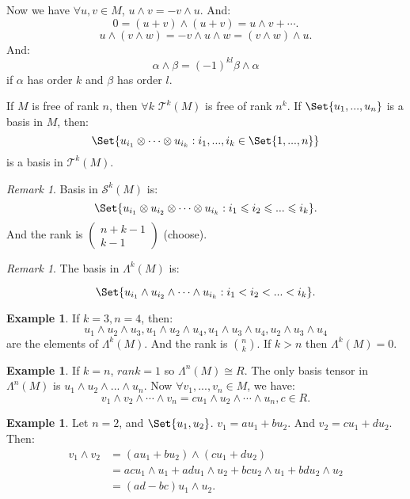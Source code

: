 \documentclass[9pt,reqno,twoside]{amsbook}
\theoremstyle{plain}
\numberwithin{section}{chapter}
\numberwithin{equation}{chapter}
\theoremstyle{definition}
\newtheorem{Ex}[theorem]{Example}
\theoremstyle{remark}
\newtheorem{rem}[theorem]{Remark}
\theoremstyle{plain}
\newcommand{\mc}{\mathcal}
\newcommand{\bee}{\begin{equation}\begin{aligned}}
\newcommand{\eee}{\end{aligned}\end{equation}}
\newcommand{\tens}{\otimes}
\newcommand{\lpar}{\left(}
\newcommand{\rpar}{\right)}
\renewcommand{\leq}{\leqslant}
\begin{document}
Now we have $\forall u,v \in M$, $u \wedge v = -v \wedge u$. And:
$$
0 = (u + v) \wedge (u + v) = u \wedge v + \cdots.
$$
$$
u \wedge(v \wedge w) = -v \wedge u \wedge w = (v \wedge w) \wedge u.
$$
And:
$$
\alpha \wedge \beta = (-1)^{kl} \beta \wedge \alpha
$$
 if $\alpha$ has order $k$ and $\beta$ has order $l$. 
 
 If $M$ is free of rank $n$, then $\forall k$ $\mc{T}^k(M)$ is free of rank $n^k$. If $\Set{u_1,...,u_n}$ is a basis in $M$, then:
 $$
 \Set{u_{i_1} \tens \cdots \tens u_{i_k}:i_1,...,i_k \in \Set{1,...,n}}
 $$
  is a basis in $\mc{T}^k(M)$. 
 
 \begin{rem}
 Basis in $\mc{S}^k(M)$ is:
 $$
 \Set{u_{i_1} \tens u_{i_2} \tens \cdots \tens u_{i_k}:i_1 \leq i_2 \leq ... \leq i_k}. 
 $$
 And the rank is $\lpar \begin{matrix}
 n + k - 1\\
 k - 1
\end{matrix}  \rpar$ (choose). 
 \end{rem}
 
 \begin{rem}
 The basis in $\Lambda^k(M)$ is:
 
 $$
 \Set{u_{i_1} \wedge u_{i_2} \wedge \cdots \wedge u_{i_k}: i_1 < i_2 < ... < i_k}.
 $$
 \end{rem}
 
 \begin{Ex}
 If $k = 3, n = 4$, then:
 $$
 u_1 \wedge u_2 \wedge u_3, u_1 \wedge u_2 \wedge u_4, u_1 \wedge u_3 \wedge u_4, u_2 \wedge u_3 \wedge u_4
 $$
 are the elements of $\Lambda^k(M)$. And the rank is $\binom{n}{k}$. If $k > n$ then $\Lambda^k(M) = 0$. 
 \end{Ex}
 
 \begin{Ex}
 If $k = n$, $rank = 1$ so $\Lambda^n(M) \cong R$. The only basis tensor in $\Lambda^n(M)$ is $u_1 \wedge u_2 \wedge ... \wedge u_n$. 
 Now $\forall v_1,...,v_n \in M$, we have:
 $$
 v_1 \wedge v_2 \wedge \cdots \wedge v_n = cu_1 \wedge u_2 \wedge \cdots \wedge u_n, c\in R.
 $$
 \end{Ex}
 
 \begin{Ex}
 Let $n = 2$, and $\Set{u_1,u_2}$. $v_1 = au_1 + bu_2$. And $v_2 = cu_1 + du_2$. Then:
 \bee
 v_1 \wedge v_2 &= (au_1 + bu_2) \wedge (cu_1 + du_2)\\
 &= acu_1 \wedge u_1 + adu_1 \wedge u_2 + bcu_2 \wedge u_1 + bdu_2 \wedge u_2\\
 &= (ad - bc)u_1 \wedge u_2.
 \eee
 \end{Ex}
 
\end{document}
